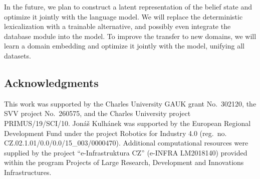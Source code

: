 \documentclass[11pt,a4paper]{article}
\begin{document}
In the future, we plan to construct a latent representation of the belief state and optimize it jointly with the language model. We will replace the deterministic lexicalization with a trainable alternative, and possibly even integrate the database module into the model. To improve the transfer to new domains, we will learn a domain embedding and optimize it jointly with the model, unifying all datasets.


\subsection*{Acknowledgments}
This work was supported by the Charles University GAUK grant No.~302120, the SVV project No.~260575, and the Charles University project PRIMUS/19/SCI/10.
Jonáš Kulhánek was supported by the European Regional Development Fund under the project Robotics for Industry 4.0 (reg.~no. CZ.02.1.01/0.0/0.0/15\_003/0000470). Additional computational resources were supplied by the project ``e-Infrastruktura CZ'' (e-INFRA LM2018140) provided within the program Projects of Large Research, Development and Innovations Infrastructures.



\end{document}
